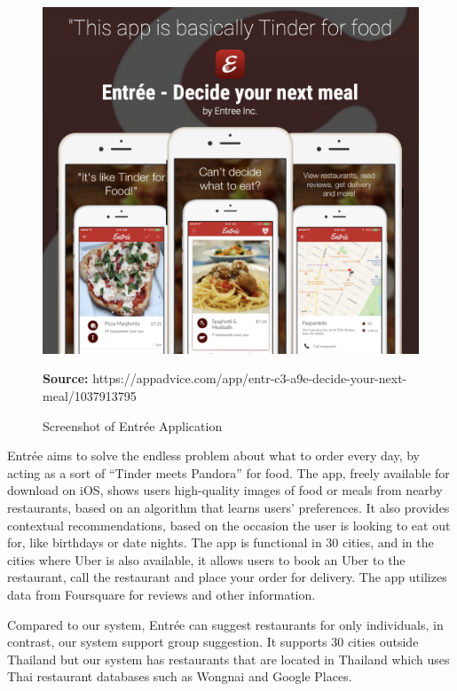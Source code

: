 \documentclass[12pt,oneside,openright,a4paper]{cpe-english-project}
\newcommand*{\captionsource}[2]{%
  \caption[{#1}]{#1}\vspace{-8pt}
  \textbf{Source:} #2}
\begin{document}
\begin{figure}[H]\centering
\includegraphics[width=400pt]{./images/2eatsee.png}
\label{fig:2eatsee}
\captionsource{Screenshot of Entrée Application}{https://appadvice.com/app/entr-c3-a9e-decide-your-next-meal/1037913795}
\end{figure}\vspace{-24pt}
\vspace{1em}

Entrée aims to solve the endless problem about what to order every day, by acting as a sort of “Tinder meets Pandora” for food. The app, freely available for download on iOS, shows users high-quality images of food or meals from nearby restaurants, based on an algorithm that learns users’ preferences. It also provides contextual recommendations, based on the occasion the user is looking to eat out for, like birthdays or date nights. The app is functional in 30 cities, and in the cities where Uber is also available, it allows users to book an Uber to the restaurant, call the restaurant and place your order for delivery. The app utilizes data from Foursquare for reviews and other information. \cite{Entréechoosefromaworldofdisheswithasingletouch}

Compared to our system, Entrée can suggest restaurants for only individuals, in contrast, our system support group suggestion. It supports 30 cities outside Thailand but our system has restaurants that are located in Thailand which uses Thai restaurant databases such as Wongnai and Google Places.
\end{document}
